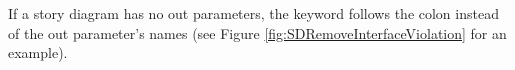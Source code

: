 If a story diagram has no out parameters, the keyword  follows the colon instead of the out parameter's names (see Figure \ref{fig:SDRemoveInterfaceViolation} for an example).




